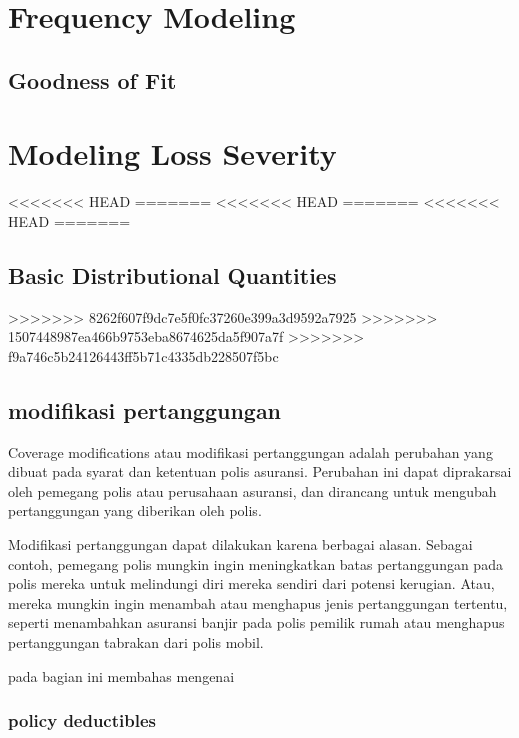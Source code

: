 \documentclass[
]{book}
\begin{document}
\hypertarget{frequency-modeling}{%
\chapter{Frequency Modeling}\label{frequency-modeling}}

\hypertarget{goodness-of-fit}{%
\section{Goodness of Fit}\label{goodness-of-fit}}

\hypertarget{modeling-loss-severity}{%
\chapter{Modeling Loss Severity}\label{modeling-loss-severity}}

<<<<<<< HEAD
=======
<<<<<<< HEAD
=======
<<<<<<< HEAD
=======
\hypertarget{basic-distributional-quantities}{%
\section{Basic Distributional Quantities}\label{basic-distributional-quantities}}

>>>>>>> 8262f607f9dc7e5f0fc37260e399a3d9592a7925
>>>>>>> 1507448987ea466b9753eba8674625da5f907a7f
>>>>>>> f9a746c5b24126443ff5b71c4335db228507f5bc
\hypertarget{modifikasi-pertanggungan}{%
\section{modifikasi pertanggungan}\label{modifikasi-pertanggungan}}

Coverage modifications atau modifikasi pertanggungan adalah perubahan yang dibuat pada syarat dan ketentuan polis asuransi. Perubahan ini dapat diprakarsai oleh pemegang polis atau perusahaan asuransi, dan dirancang untuk mengubah pertanggungan yang diberikan oleh polis.

Modifikasi pertanggungan dapat dilakukan karena berbagai alasan. Sebagai contoh, pemegang polis mungkin ingin meningkatkan batas pertanggungan pada polis mereka untuk melindungi diri mereka sendiri dari potensi kerugian. Atau, mereka mungkin ingin menambah atau menghapus jenis pertanggungan tertentu, seperti menambahkan asuransi banjir pada polis pemilik rumah atau menghapus pertanggungan tabrakan dari polis mobil.

pada bagian ini membahas mengenai

\hypertarget{policy-deductibles}{%
\subsection{policy deductibles}\label{policy-deductibles}}
\end{document}
